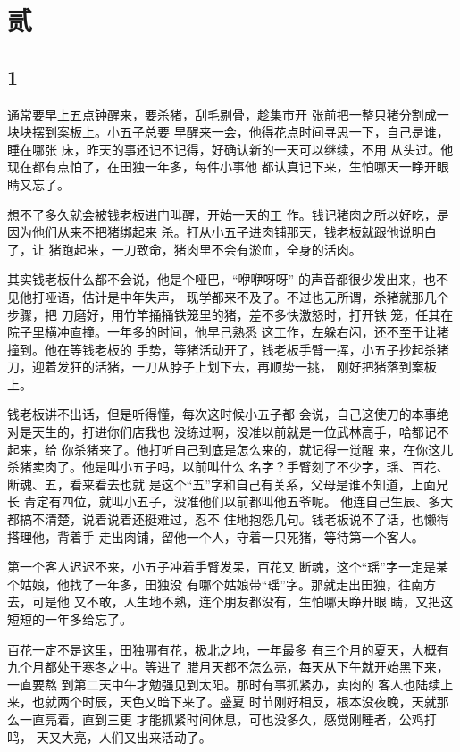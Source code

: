 \section{贰}

{\centering\subsection{1}}

通常要早上五点钟醒来，要杀猪，刮毛剔骨，趁集市开
张前把一整只猪分割成一块块摆到案板上。小五子总要
早醒来一会，他得花点时间寻思一下，自己是谁，睡在哪张
床，昨天的事还记不记得，好确认新的一天可以继续，不用
从头过。他现在都有点怕了，在田独一年多，每件小事他
都认真记下来，生怕哪天一睁开眼睛又忘了。

想不了多久就会被钱老板进门叫醒，开始一天的工
作。钱记猪肉之所以好吃，是因为他们从来不把猪绑起来
杀。打从小五子进肉铺那天，钱老板就跟他说明白了，让
猪跑起来，一刀致命，猪肉里不会有淤血，全身的活肉。

其实钱老板什么都不会说，他是个哑巴，“咿咿呀呀”
的声音都很少发出来，也不见他打哑语，估计是中年失声，
现学都来不及了。不过也无所谓，杀猪就那几个步骤，把
刀磨好，用竹竿捅捅铁笼里的猪，差不多快激怒时，打开铁
笼，任其在院子里横冲直撞。一年多的时间，他早己熟悉
这工作，左躲右闪，还不至于让猪撞到。他在等钱老板的
手势，等猪活动开了，钱老板手臂一挥，小五子抄起杀猪
刀，迎着发狂的活猪，一刀从脖子上划下去，再顺势一挑，
刚好把猪落到案板上。

钱老板讲不出话，但是听得懂，每次这时候小五子都
会说，自己这使刀的本事绝对是天生的，打进你们店我也
没练过啊，没准以前就是一位武林高手，哈都记不起来，给
你杀猪来了。他打听自己到底是怎么来的，就记得一觉醒
来，在你这儿杀猪卖肉了。他是叫小五子吗，以前叫什么
名字？手臂刻了不少字，瑶、百花、断魂、五，看来看去也就
是这个“五”字和自己有关系，父母是谁不知道，上面兄长
青定有四位，就叫小五子，没准他们以前都叫他五爷呢。
他连自己生辰、多大都搞不清楚，说着说着还挺难过，忍不
住地抱怨几句。钱老板说不了话，也懒得搭理他，背着手
走出肉铺，留他一个人，守着一只死猪，等待第一个客人。

第一个客人迟迟不来，小五子冲着手臂发呆，百花又
断魂，这个“瑶”字一定是某个姑娘，他找了一年多，田独没
有哪个姑娘带“瑶”字。那就走出田独，往南方去，可是他
又不敢，人生地不熟，连个朋友都没有，生怕哪天睁开眼
睛，又把这短短的一年多给忘了。

百花一定不是这里，田独哪有花，极北之地，一年最多
有三个月的夏天，大概有九个月都处于寒冬之中。等进了
腊月天都不怎么亮，每天从下午就开始黑下来，一直要熬
到第二天中午才勉强见到太阳。那时有事抓紧办，卖肉的
客人也陆续上来，也就两个时辰，天色又暗下来了。盛夏
时节刚好相反，根本没夜晚，天就那么一直亮着，直到三更
才能抓紧时间休息，可也没多久，感觉刚睡者，公鸡打鸣，
天又大亮，人们又出来活动了。

